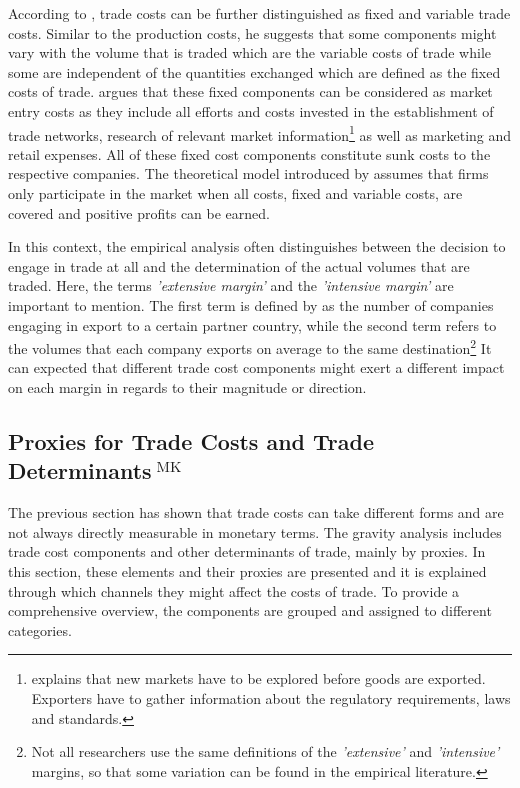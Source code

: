 According to \textcite{Melitz_2003}, trade costs can be further distinguished as fixed and variable trade costs. Similar to the production costs, he suggests that some components might vary with the volume that is traded which are the variable costs of trade while some are independent of the quantities exchanged which are defined as the fixed costs of trade. \textcite{Melitz_2003} argues that these fixed components can be considered as market entry costs as they include all efforts and costs invested in the establishment of trade networks, research of relevant market information\footnote{\textcite{Melitz_2003} explains that new markets have to be explored before goods are exported. Exporters have to gather information about the regulatory requirements, laws and standards.} as well as marketing and retail expenses. All of these fixed cost components constitute sunk costs to the respective companies. The theoretical model introduced by \textcite{Melitz_2003} assumes that firms only participate in the market when all costs, fixed and variable costs, are covered and positive profits can be earned. 

In this context, the empirical analysis often distinguishes between the decision to engage in trade at all and the determination of the actual volumes that are traded. Here, the terms \textit{'extensive margin'} and the \textit{'intensive margin'} are important to mention. The first term is defined by \textcite{Lawless2010} as the number of companies engaging in export to a certain partner country, while the second term refers to the volumes that each company exports on average to the same destination\footnote{Not all researchers use the same definitions of the \textit{'extensive'} and \textit{'intensive'} margins, so that some variation can be found in the empirical literature.} It can expected that different trade cost components might exert a different impact on each margin in regards to their magnitude or direction.   

\subsection[Proxies for Trade Costs and Trade Determinants]{Proxies for Trade Costs and Trade Determinants$^{\text{ MK}}$}
\label{sec:Proxies_Mass}

The previous section has shown that trade costs can take different forms and are not always directly measurable in monetary terms. The gravity analysis includes trade cost components and other determinants of trade, mainly by proxies. In this section, these elements and their proxies are presented and it is explained through which channels they might affect the costs of trade. To provide a comprehensive overview, the components are grouped and assigned to different categories. 


